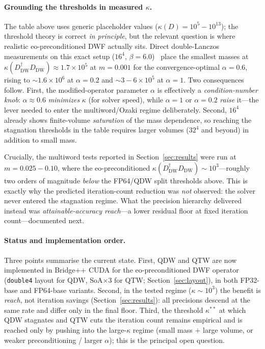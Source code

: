 \documentclass[12pt,a4paper]{article}
\begin{document}
\paragraph{Grounding the thresholds in measured $\kappa$.}
The table above uses generic placeholder values
($\kappa(D)=10^{5}\!-\!10^{13}$); the threshold theory is correct
\emph{in principle}, but the relevant question is where realistic
eo-preconditioned DWF actually sits. Direct double-Lanczos measurements on
this exact setup ($16^4$, $\beta=6.0$)~\cite{Chen2026} place the smallest
masses at $\kappa(D_{\mathrm{DW}}^\dagger D_{\mathrm{DW}}) \approx
1.7\times10^{5}$ at $m=0.001$ for the convergence-optimal $\alpha=0.6$, rising
to $\sim\!1.6\times10^{6}$ at $\alpha=0.2$ and $\sim\!3\!-\!6\times10^{5}$ at
$\alpha=1$. Two consequences follow. First, the modified-operator parameter
$\alpha$ is effectively a \emph{condition-number knob}: $\alpha\approx0.6$
\emph{minimizes} $\kappa$ (for solver speed), while $\alpha=1$ or $\alpha=0.2$
\emph{raise} it---the lever needed to enter the multiword/Ozaki regime
deliberately. Second, $16^4$ already shows finite-volume \emph{saturation} of
the mass dependence, so reaching the stagnation thresholds in the table
requires larger volumes ($32^4$ and beyond) in addition to small mass.

Crucially, the multiword tests reported in Section~\ref{sec:results} were run
at $m=0.025\!-\!0.10$, where the eo-preconditioned
$\kappa(D_{\mathrm{DW}}^\dagger D_{\mathrm{DW}}) \sim 10^{3}$---roughly two
orders of magnitude \emph{below} the FP64/QDW split thresholds above. This is
exactly why the predicted iteration-count reduction was \emph{not} observed:
the solver never entered the stagnation regime. What the precision hierarchy
delivered instead was \emph{attainable-accuracy reach}---a lower residual
floor at fixed iteration count---documented next.

\paragraph{Status and implementation order.}
Three points summarise the current state. First, QDW and QTW are now implemented
in Bridge++ CUDA for the eo-preconditioned DWF operator (\texttt{double4} layout
for QDW, SoA$\times3$ for QTW; Section~\ref{sec:layout}), in both FP32-base and
FP64-base variants. Second, in the tested regime ($\kappa \sim 10^{3}$) the
benefit is \emph{reach}, not iteration savings (Section~\ref{sec:results}): all
precisions descend at the same rate and differ only in the final floor. Third,
the threshold $\kappa^{**}$ at which QDW stagnates and QTW cuts the iteration
count remains empirical and is reached only by pushing into the large-$\kappa$
regime (small mass $+$ large volume, or weaker preconditioning / larger
$\alpha$); this is the principal open question.
\end{document}
